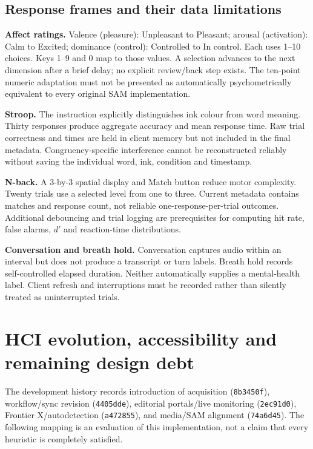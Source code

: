 \documentclass[11pt,a4paper]{article}
\newcommand{\code}[1]{{\small\nolinkurl{#1}}}
\begin{document}
\subsection{Response frames and their data limitations}
\textbf{Affect ratings.} Valence (pleasure): Unpleasant to Pleasant; arousal (activation): Calm to Excited; dominance (control): Controlled to In control. Each uses 1--10 choices. Keys 1--9 and 0 map to those values. A selection advances to the next dimension after a brief delay; no explicit review/back step exists. The ten-point numeric adaptation must not be presented as automatically psychometrically equivalent to every original SAM implementation.

\textbf{Stroop.} The instruction explicitly distinguishes ink colour from word meaning. Thirty responses produce aggregate accuracy and mean response time. Raw trial correctness and times are held in client memory but not included in the final metadata. Congruency-specific interference cannot be reconstructed reliably without saving the individual word, ink, condition and timestamp.

\textbf{N-back.} A 3-by-3 spatial display and Match button reduce motor complexity. Twenty trials use a selected level from one to three. Current metadata contains matches and response count, not reliable one-response-per-trial outcomes. Additional debouncing and trial logging are prerequisites for computing hit rate, false alarms, $d'$ and reaction-time distributions.

\textbf{Conversation and breath hold.} Conversation captures audio within an interval but does not produce a transcript or turn labels. Breath hold records self-controlled elapsed duration. Neither automatically supplies a mental-health label. Client refresh and interruptions must be recorded rather than silently treated as uninterrupted trials.

\section{HCI evolution, accessibility and remaining design debt}
The development history records introduction of acquisition (\code{8b3450f}), workflow/sync revision (\code{4405dde}), editorial portals/live monitoring (\code{2ec91d0}), Frontier X/autodetection (\code{a472855}), and media/SAM alignment (\code{74a6d45}). The following mapping is an evaluation of this implementation, not a claim that every heuristic is completely satisfied.
\end{document}
